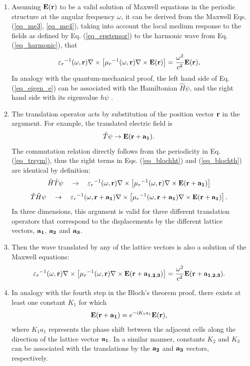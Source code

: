 \begin{enumerate}
\item{
Assuming $\mathbf{E}({\mathbf{r}})$ to be a  valid solution of Maxwell equations in the periodic structure at the angular frequency $\omega$,
it can be derived from the Maxwell Eqs. (\ref{eq_me3}, \ref{eq_me4}), taking into account the local medium response to the fields as defined by Eq. (\ref{eq_epstensor}) to the harmonic wave from Eq. (\ref{eq_harmonic}), that
\begin{equation} 
{\varepsilon_r}^{-1}(\omega,{\mathbf{r}}) \nabla\times \left[{\mu_r}^{-1 }(\omega,{\mathbf{r}}) \nabla\times \mathbf{E}({\mathbf{r}}) \right] = \frac{\omega^2}{c^2}\mathbf{E}({\mathbf{r}}),   \label{eq_eigen_e}
\end{equation}
In analogy with the quantum-mechanical proof, the left hand side of Eq. (\ref{eq_eigen_e}) can be associated with the Hamiltonian $\hat H\psi$, and the right hand side with its eigenvalue $h\psi$ \cite{johnson2003introduction}. 
} 
\item{
The translation operator acts by substitution of the position vector ${\mathbf{r}}$ in the argument. For example, the translated electric field is
\begin{equation} \hat T\psi \rightarrow \mathbf{E}({\mathbf{r}}+\mathbf{a_1}). \label{eq_blocht}\end{equation}
The commutation relation directly follows from the periodicity in Eq. (\ref{eq_trsym}), thus the right terms in Eqs. (\ref{eq_blochht}) and (\ref{eq_blochth}) are identical by definition:
\begin{equation} \hat H \hat T \psi \quad  \rightarrow \quad  {\varepsilon_r}^{-1}(\omega,{\mathbf{r}}    ) \nabla\times \left[{\mu_r}^{-1 }(\omega,{\mathbf{r}}    ) \nabla\times \mathbf{E}({\mathbf{r}}+{\mathbf{a_1}})\right]  \label{eq_blochht}\end{equation}
\begin{equation} \hat T \hat H \psi \quad  \rightarrow \quad  {\varepsilon_r}^{-1}(\omega,{\mathbf{r}}+{\mathbf{a_1}}) \nabla\times \left[{\mu_r}^{-1 }(\omega,{\mathbf{r}}+{\mathbf{a_1}}) \nabla\times \mathbf{E}({\mathbf{r}}+{\mathbf{a_1}})\right] .  \label{eq_blochth}\end{equation}
In three dimensions, this argument is valid for three different translation operators that correspond to the displacements by the different lattice vectors, ${\mathbf{a_1}}$, ${\mathbf{a_2}}$ and ${\mathbf{a_3}}$.
} 
\item{
Then the wave translated by any of the lattice vectors is also a solution of the Maxwell equations:
\begin{equation}  {\varepsilon_r}^{-1}(\omega,{\mathbf{r}}) \nabla\times \left[{\mu_r}^{-1 }(\omega,{\mathbf{r}}) \nabla\times   \mathbf{E}({\mathbf{r}}+{\mathbf{a_{1,2,3}}})\right] =  \frac{\omega^2}{c^2}\mathbf{E}({\mathbf{r}}+{\mathbf{a_{1,2,3}}}).  \label{eq_blochme}\end{equation}
}
\item{In analogy with the fourth step in the Bloch's theorem proof, there exists at least one constant $K_1$ for which
\begin{equation}  \mathbf{E}({\mathbf{r}}+{\mathbf{a_1}}) = e^{-{\mathrm i} K_1 a_1} \mathbf{E}({\mathbf{r}}),  \label{eq_blochtt}\end{equation}
	where $K_1 a_1$ represents the phase shift between the adjacent cells along the direction of the lattice vector ${\mathbf{a_1}}$. In a similar manner, constants $K_2$ and $K_3$ can be associated with the translations by the ${\mathbf{a_2}}$ and ${\mathbf{a_3}}$ vectors, respectively. 
}
 \end{enumerate}

